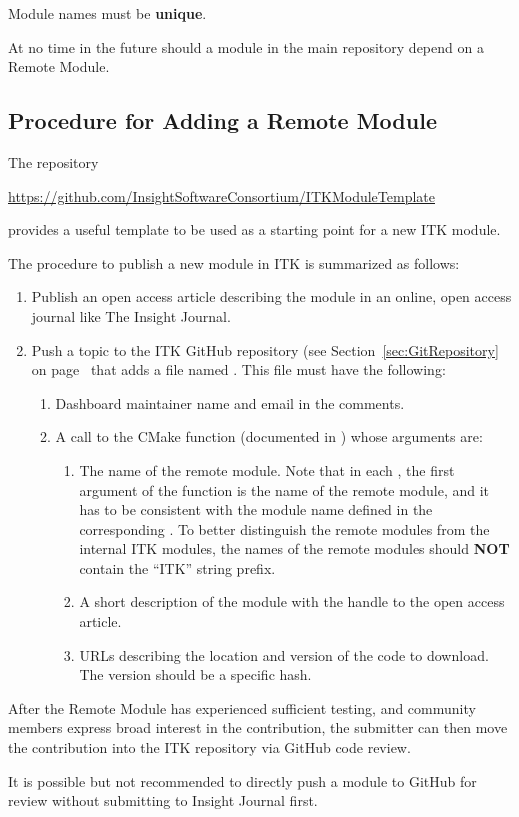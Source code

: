 Module names must be \textbf{unique}.

At no time in the future should a module in the main repository depend on a
Remote Module.

\subsection{Procedure for Adding a Remote Module}%
\label{subsec:ProcedureAddingRemoteModules}

The repository
\begin{center}
  \url{https://github.com/InsightSoftwareConsortium/ITKModuleTemplate}
\end{center}

provides a useful template to be used as a starting point for a new ITK module.

The procedure to publish a new module in ITK is summarized as follows:
\begin{enumerate}
\item Publish an open access article describing the module in an online, open
  access journal like The Insight Journal.
\item Push a topic to the ITK GitHub repository (see
  Section~\ref{sec:GitRepository} on page~\pageref{sec:GitRepository} that
  adds a file named
  . This file must have the
  following:
  \begin{enumerate}
    \item Dashboard maintainer name and email in the comments.
    \item A call to the  CMake function (documented in
      ) whose arguments are:
      \begin{enumerate}
      \item The name of the remote module. Note that in each
        , the first argument of the function
         is the name of the remote module, and it has to be
        consistent with the module name defined in the corresponding
        . To better distinguish the remote
        modules from the internal ITK modules, the names of the remote modules should
        \textbf{NOT} contain the ``ITK'' string prefix.
      \item A short description of the module with the handle to the open access
        article.
      \item URLs describing the location and version of the code to download. The
        version should be a specific hash.
      \end{enumerate}
  \end{enumerate}
\end{enumerate}

After the Remote Module has experienced sufficient testing, and community
members express broad interest in the contribution, the submitter can then move
the contribution into the ITK repository via GitHub code review.

It is possible but not recommended to directly push a module to GitHub for
review without submitting to Insight Journal first.
